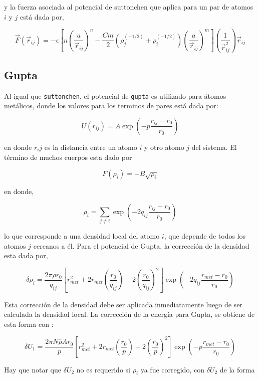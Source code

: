 y la fuerza asociada al potencial de suttonchen que aplica para un par de atomos $i$ y $j$ est\'a dada por,

$$\vec{F}(\vec{r}_{ij}) = -\epsilon\left[n\left(\frac{a}{\vec{r}_{ij}}\right)^n - \frac{Cm}{2}(\rho_j^{(-1/2)}+\rho_i^{(-1/2)})\left(\frac{a}{\vec{r}_{ij}}\right)^m\right]\left(\frac{1}{\vec{r}_{ij}^2}\right)\vec{r}_{ij}$$



\subsection{Gupta}

Al igual que \verb|suttonchen|, el potencial de \verb|gupta| es utilizado para \'atomos met\'alicos, donde los valores para los terminos de pares est\'a dada por:

$$U(r_{ij}) = A\exp{\left(-p\frac{r_{ij}-r_0}{r_0}\right)}$$

en donde $r_ij$ es la distancia entre un atomo $i$ y otro atomo $j$ del sistema. El t\'ermino de muchos cuerpos esta dado por

$$F(\rho_{i}) = -B\sqrt{\rho_i}$$

en donde,

$$\rho_i = \sum_{j\neq i} \exp{\left(-2q_{ij}\frac{r_{ij}-r_0}{r_0}\right)}$$

lo que corresponde a una densidad local del atomo $i$, que depende de todos los atomos $j$ cercanos a \'el. Para el potencial de Gupta, la correcci\'on de la densidad esta dada por,

$$\delta\rho_i=\frac{2\pi\overline{\rho}r_0}{q_{ij}}\left[r^2_{met}+2r_{met}\left(\frac{r_0}{q_{ij}}\right)+2\left(\frac{r_0}{q_{ij}}\right)^2\right]\exp{\left(-2q_{ij}\frac{r_{met}-r_0}{r_0}\right)}$$

Esta correcci\'on de la densidad debe ser aplicada inmediatamente luego de ser calculada la densidad local. La correcci\'on de la energ\'ia para Gupta, se obtiene de esta forma con :

$$\delta U_1 = \frac{2\pi N\overline{\rho}A r_0}{p}\left[r^2_{met}+2r_{met}\left(\frac{r_0}{p}\right)+2\left(\frac{r_0}{p}\right)^2\right]\exp{\left(-p\frac{r_{met}-r_0}{r_0}\right)}$$

Hay que notar que $\delta U_2$ no es requerido si $\rho_i$ ya fue corregido, con $\delta U_2$ de la forma


